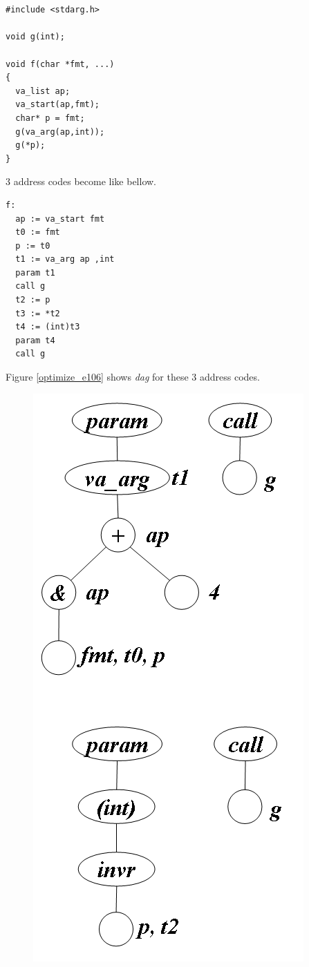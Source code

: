 \begin{Example}
\label{optimize_e105}
\begin{verbatim}


#include <stdarg.h>

void g(int);

void f(char *fmt, ...)
{
  va_list ap;
  va_start(ap,fmt);
  char* p = fmt;
  g(va_arg(ap,int));
  g(*p);
}
\end{verbatim}
3 address codes become like bellow.
\begin{verbatim}
f:
  ap := va_start fmt
  t0 := fmt
  p := t0
  t1 := va_arg ap ,int
  param t1
  call g
  t2 := p
  t3 := *t2
  t4 := (int)t3
  param t4
  call g
\end{verbatim}
Figure \ref{optimize_e106} shows {\em dag} for these 3 address codes.
\begin{figure}[htbp]
\begin{center}
\begin{htmlonly}
\includegraphics[width=0.546\linewidth,height=1.2\linewidth]{opt046.png}
\end{htmlonly}
\begin{latexonly}

\end{latexonly}
\end{center}
\end{figure}
\end{Example}

